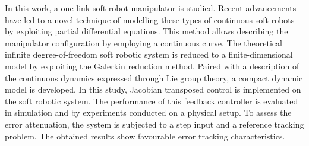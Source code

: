 In this work, a one-link soft robot manipulator is studied. Recent advancements have led to a novel technique of modelling these types of continuous soft robots by exploiting partial differential equations. This method allows describing the manipulator configuration by employing a continuous curve. The theoretical infinite degree-of-freedom soft robotic system is reduced to a finite-dimensional model by exploiting the Galerkin reduction method. Paired with a description of the continuous dynamics expressed through Lie group theory, a compact dynamic model is developed. In this study, Jacobian transposed control is implemented on the soft robotic system. The performance of this feedback controller is evaluated in simulation and by experiments conducted on a physical setup. To assess the error attenuation, the system is subjected to a step input and a reference tracking problem. The obtained results show favourable error tracking characteristics.

